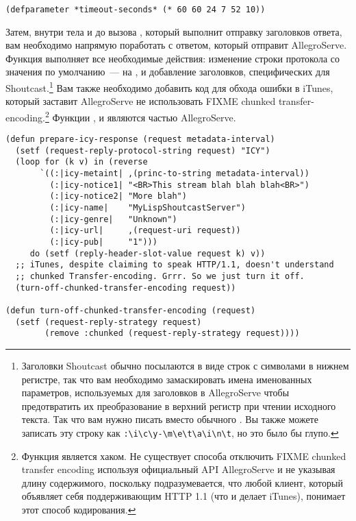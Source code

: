 \begin{lstlisting}
(defparameter *timeout-seconds* (* 60 60 24 7 52 10))
\end{lstlisting}

Затем, внутри тела  и до вызова , который
выполнит отправку заголовков ответа, вам необходимо напрямую поработать с ответом, который
отправит AllegroServe.  Функция  выполняет все необходимые
действия: изменение строки протокола со значения по умолчанию~---  на
, и добавление заголовков, специфических для Shoutcast.\footnote{Заголовки
  Shoutcast обычно посылаются в виде строк с символами в нижнем регистре, так что вам
  необходимо замаскировать имена именованных параметров, используемых для заголовков в
  AllegroServe чтобы предотвратить их преобразование в верхний регистр при чтении
  исходного текста.  Так что вам нужно писать  вместо обычного
  .  Вы также можете записать эту строку как
  \lstinline!:\i\c\y-\m\e\t\a\i\n\t!, но это было бы глупо.}  Вам также необходимо
добавить код для обхода ошибки в iTunes, который заставит AllegroServe не использовать
FIXME chunked transfer-encoding.\footnote{Функция
   является хаком.  Не существует способа
  отключить FIXME chunked transfer encoding используя официальный API AllegroServe и не
  указывая длину содержимого, поскольку подразумевается, что любой клиент, который
  объявляет себя поддерживающим HTTP 1.1 (что и делает iTunes), понимает этот способ
  кодирования.}  Функции ,  и
 являются частью AllegroServe.

\begin{lstlisting}
(defun prepare-icy-response (request metadata-interval)
  (setf (request-reply-protocol-string request) "ICY")
  (loop for (k v) in (reverse
       `((:|icy-metaint| ,(princ-to-string metadata-interval))
         (:|icy-notice1| "<BR>This stream blah blah blah<BR>")
         (:|icy-notice2| "More blah")
         (:|icy-name|    "MyLispShoutcastServer")
         (:|icy-genre|   "Unknown")
         (:|icy-url|     ,(request-uri request))
         (:|icy-pub|     "1")))
     do (setf (reply-header-slot-value request k) v))
  ;; iTunes, despite claiming to speak HTTP/1.1, doesn't understand
  ;; chunked Transfer-encoding. Grrr. So we just turn it off.
  (turn-off-chunked-transfer-encoding request))

(defun turn-off-chunked-transfer-encoding (request)
  (setf (request-reply-strategy request)
        (remove :chunked (request-reply-strategy request))))
\end{lstlisting}

